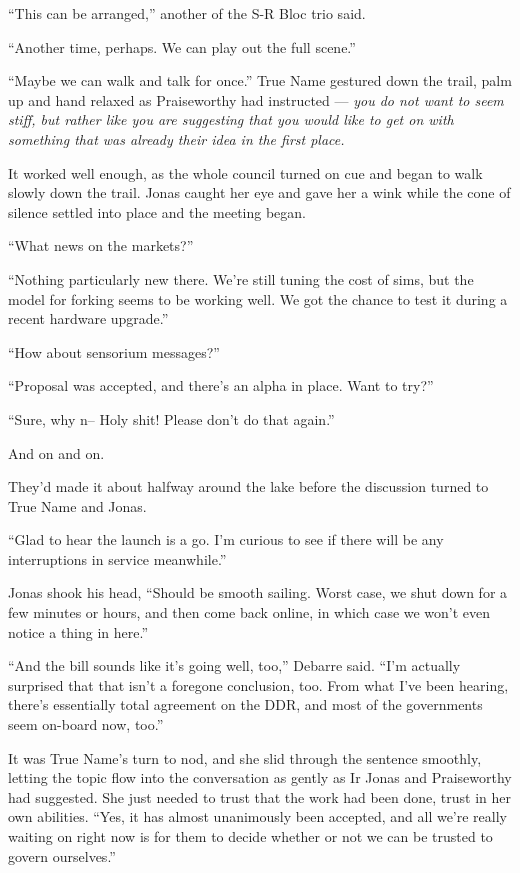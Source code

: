 ``This can be arranged,'' another of the S-R Bloc trio said.

``Another time, perhaps. We can play out the full scene.''

``Maybe we can walk and talk for once.'' True Name gestured down the trail, palm up and hand relaxed as Praiseworthy had instructed — \emph{you do not want to seem stiff, but rather like you are suggesting that you would like to get on with something that was already their idea in the first place.}

It worked well enough, as the whole council turned on cue and began to walk slowly down the trail. Jonas caught her eye and gave her a wink while the cone of silence settled into place and the meeting began.

``What news on the markets?''

``Nothing particularly new there. We're still tuning the cost of sims, but the model for forking seems to be working well. We got the chance to test it during a recent hardware upgrade.''

``How about sensorium messages?''

``Proposal was accepted, and there's an alpha in place. Want to try?''

``Sure, why n-- Holy shit! Please don't do that again.''

And on and on.

They'd made it about halfway around the lake before the discussion turned to True Name and Jonas.

``Glad to hear the launch is a go. I'm curious to see if there will be any interruptions in service meanwhile.''

Jonas shook his head, ``Should be smooth sailing. Worst case, we shut down for a few minutes or hours, and then come back online, in which case we won't even notice a thing in here.''

``And the bill sounds like it's going well, too,'' Debarre said. ``I'm actually surprised that that isn't a foregone conclusion, too. From what I've been hearing, there's essentially total agreement on the DDR, and most of the governments seem on-board now, too.''

It was True Name's turn to nod, and she slid through the sentence smoothly, letting the topic flow into the conversation as gently as Ir Jonas and Praiseworthy had suggested. She just needed to trust that the work had been done, trust in her own abilities. ``Yes, it has almost unanimously been accepted, and all we're really waiting on right now is for them to decide whether or not we can be trusted to govern ourselves.''

